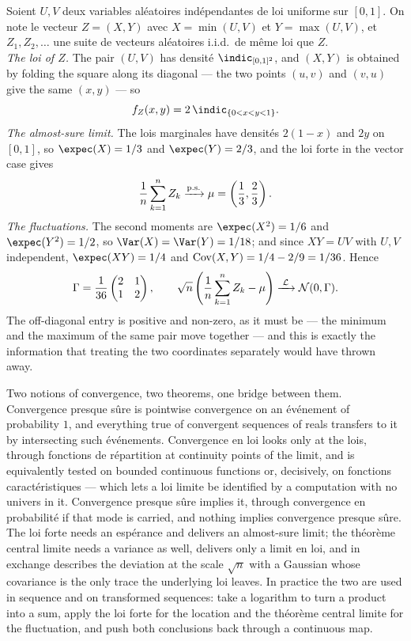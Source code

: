 \begin{example}
  Soient $U, V$ deux variables aléatoires indépendantes de loi uniforme sur
  $[0,1]$. On note le vecteur
  $Z = (X, Y)$ avec $X = \min(U,V)$ et $Y = \max(U,V)$, et
  $Z_{1}, Z_{2}, \dots$ une suite de vecteurs aléatoires i.i.d.\ de même loi
  que $Z$.\\
  \emph{The loi of $Z$.} The pair $(U,V)$ has densité $\indic_{[0,1]^{2}}$, and
  $(X,Y)$ is obtained by folding the square along its diagonal --- the two
  points $(u,v)$ and $(v,u)$ give the same $(x,y)$ --- so
  \[
    f_{Z}(x,y) = 2 \, \indic_{\{0 < x < y < 1\}} .
  \]
  \emph{The almost-sure limit.} The lois marginales have densités $2(1-x)$ and
  $2y$ on $[0,1]$, so $\expec(X) = 1/3$ and $\expec(Y) = 2/3$, and the loi
  forte in the vector case gives
  \[
    \frac{1}{n}\sum_{k=1}^{n} Z_{k} \xrightarrow{\text{p.s.}} \mu = \left(\frac{1}{3},
      \frac{2}{3}\right) .
  \]
  \emph{The fluctuations.} The second moments are $\expec(X^{2}) = 1/6$ and
  $\expec(Y^{2}) = 1/2$, so $\Var(X) = \Var(Y) = 1/18$; and since
  $XY = UV$ with $U, V$ independent, $\expec(XY) = 1/4$ and
  $\operatorname{Cov}(X,Y) = 1/4 - 2/9 = 1/36$. Hence
  \[
    \Gamma = \frac{1}{36}\begin{pmatrix} 2 & 1 \\ 1 & 2 \end{pmatrix} ,
    \qquad
    \sqrt{n}\left(\frac{1}{n}\sum_{k=1}^{n} Z_{k} - \mu\right)
      \xrightarrow{\;\mathcal{L}\;} \mathcal{N}(0, \Gamma) .
  \]
  The off-diagonal entry is positive and non-zero, as it must be --- the minimum
  and the maximum of the same pair move together --- and this is exactly the
  information that treating the two coordinates separately would have thrown
  away.
\end{example}

\begin{conclusion}
  Two notions of convergence, two theorems, one bridge between them. Convergence
  presque sûre is pointwise convergence on an événement of probability $1$, and
  everything true of convergent sequences of reals transfers to it by
  intersecting such événements. Convergence en loi looks only at the
  lois, through
  fonctions de répartition at continuity points of the limit, and is
  equivalently tested on bounded continuous functions or, decisively, on
  fonctions caractéristiques --- which lets a loi limite be identified by a
  computation with no univers in it. Convergence presque sûre implies it,
  through convergence en probabilité if that mode is carried, and nothing
  implies convergence presque sûre.\\
  The loi forte needs an espérance and delivers an almost-sure limit; the
  théorème central limite needs a variance as well, delivers only a limit en
  loi, and in exchange describes the deviation at the scale $\sqrt{n}$ with a
  Gaussian whose covariance is the only trace the underlying loi
  leaves. In
  practice the two are used in sequence and on transformed sequences: take a
  logarithm to turn a product into a sum, apply the loi forte for the location
  and the théorème central limite for the fluctuation, and push both conclusions
  back through a continuous map.
\end{conclusion}
